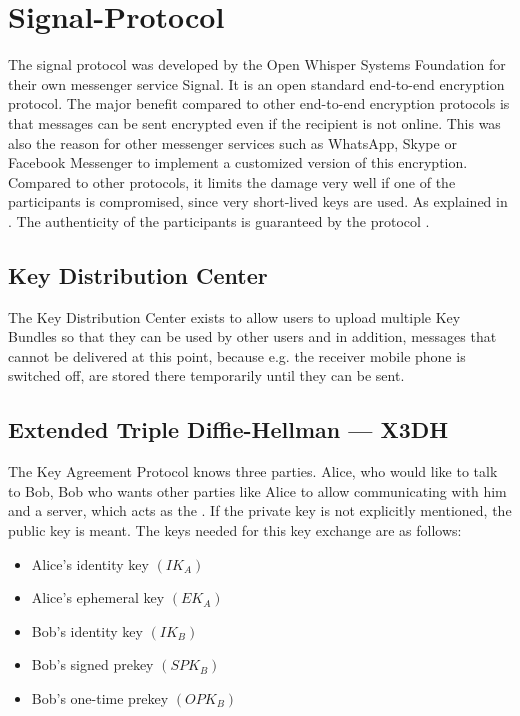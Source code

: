 \documentclass[12pt,oneside,a4paper,parskip]{scrbook}
\begin{document}
\section{Signal-Protocol}

The signal protocol was developed by the Open Whisper Systems Foundation for their own messenger service Signal. It is an open standard end-to-end encryption protocol. The major benefit compared to other end-to-end encryption protocols is that messages can be sent encrypted even if the recipient is not online. This was also the reason for other messenger services such as WhatsApp, Skype or Facebook Messenger to implement a customized version of this encryption. Compared to other protocols, it limits the damage very well if one of the participants is compromised, since very short-lived keys are used. As explained in . The authenticity of the participants is guaranteed by the  protocol \parencite{protocol_introducing_2018}.




\subsection*{Key Distribution Center}
\label{subsec:KDC}

The Key Distribution Center exists to allow users to upload multiple Key Bundles so that they can be used by other users and in addition, messages that cannot be delivered at this point, because e.g. the receiver mobile phone is switched off, are stored there temporarily until they can be sent.

\subsection{Extended Triple Diffie-Hellman --- X3DH}
\label{subsec:x3dh}

The Key Agreement Protocol knows three parties. Alice, who would like to talk to Bob, Bob who wants other parties like Alice to allow communicating with him and a server, which acts as the .
If the private key is not explicitly mentioned, the public key is meant. The keys needed for this key exchange are as follows:
\begin{itemize}
  \item Alice's identity key $   (IK_{A})  $
  \item Alice's ephemeral key $   ({EK_{A}})  $
  \item Bob's identity key $   ({IK_{B}})  $ 
  \item Bob's signed prekey $   ({SPK_{B}})  $ 
  \item Bob's one-time prekey $   ({OPK_{B}})  $
\end{itemize}
\end{document}
